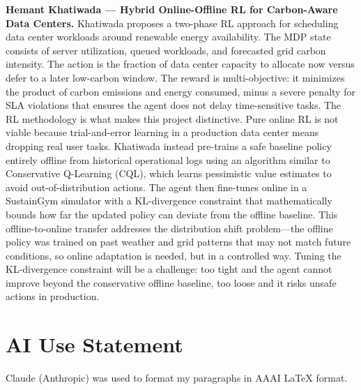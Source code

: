\documentclass[letterpaper]{article}
\begin{document}
\vspace{0.5em}

\textbf{Hemant Khatiwada --- Hybrid Online-Offline RL for Carbon-Aware Data Centers.}
Khatiwada proposes a two-phase RL approach for scheduling data center workloads around renewable energy availability. The MDP state consists of server utilization, queued workloads, and forecasted grid carbon intensity. The action is the fraction of data center capacity to allocate now versus defer to a later low-carbon window. The reward is multi-objective: it minimizes the product of carbon emissions and energy consumed, minus a severe penalty for SLA violations that ensures the agent does not delay time-sensitive tasks. The RL methodology is what makes this project distinctive. Pure online RL is not viable because trial-and-error learning in a production data center means dropping real user tasks. Khatiwada instead pre-trains a safe baseline policy entirely offline from historical operational logs using an algorithm similar to Conservative Q-Learning (CQL), which learns pessimistic value estimates to avoid out-of-distribution actions. The agent then fine-tunes online in a SustainGym simulator with a KL-divergence constraint that mathematically bounds how far the updated policy can deviate from the offline baseline. This offline-to-online transfer addresses the distribution shift problem---the offline policy was trained on past weather and grid patterns that may not match future conditions, so online adaptation is needed, but in a controlled way. Tuning the KL-divergence constraint will be a challenge: too tight and the agent cannot improve beyond the conservative offline baseline, too loose and it risks unsafe actions in production.

\section*{AI Use Statement}

Claude (Anthropic) was used to format my paragraphs in AAAI LaTeX format.


\end{document}
